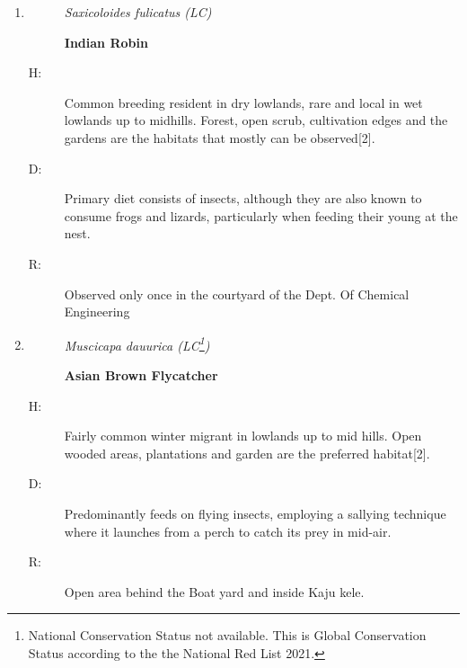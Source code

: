\begin{itemize}
\begin{enumerate}
%
\item%
\begin{description}%
\item[]%
\textit{Saxicoloides fulicatus (LC)}%
\item[]%
\textbf{Indian Robin}%
\end{description}%
\begin{description}%
\item[H: ]%
Common breeding resident in dry lowlands, rare and local in wet lowlands up to midhills. Forest, open scrub, cultivation edges and the gardens are the habitats that mostly can be observed{[}2{]}.%
\item[D: ]%
Primary diet consists of insects, although they are also known to consume frogs and lizards, particularly when feeding their young at the nest.%
\item[R: ]%
Observed only once in the courtyard of the Dept. Of Chemical Engineering%
\end{description}%
\item%
\begin{description}%
\item[]%
\textit{Muscicapa dauurica (LC\footnote{National Conservation Status not available. This is Global Conservation Status according to the the National Red List 2021.})}%
\item[]%
\textbf{Asian Brown Flycatcher}%
\end{description}%
\begin{description}%
\item[H: ]%
Fairly common winter migrant in lowlands up to mid hills. Open wooded areas, plantations and garden are the preferred habitat{[}2{]}.%
\item[D: ]%
Predominantly feeds on flying insects, employing a sallying technique where it launches from a perch to catch its prey in mid{-}air.%
\item[R: ]%
Open area behind the Boat yard and inside Kaju kele.%
\end{description}%

\end{enumerate}
\end{itemize}
